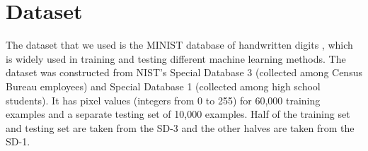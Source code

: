 \section{Dataset}
	The dataset that we used is the MINIST database of handwritten digits \cite{MNISTDatabase}, which is widely used in training and testing different machine learning methods. The dataset was constructed from NIST's Special Database 3 (collected among Census Bureau employees) and Special Database 1 (collected among high school students). It has pixel values (integers from 0 to 255) for 60,000 training examples and a separate testing set of 10,000 examples. Half of the training set and testing set are taken from the SD-3 and the other halves are taken from the SD-1.
